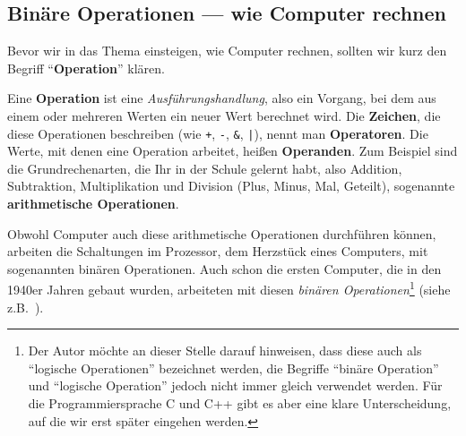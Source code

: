 \subsection{Binäre Operationen — wie Computer rechnen}
\label{sec:etwas-mathematik:binäre-operationen}

Bevor wir in das Thema einsteigen, wie Computer rechnen, sollten wir kurz den 
Begriff ``\textbf{Operation}'' klären.

Eine \textbf{Operation} ist eine \emph{Ausführungshandlung}, also ein Vorgang, 
bei dem aus einem oder mehreren Werten ein neuer Wert berechnet wird. Die 
\textbf{Zeichen}, die diese Operationen beschreiben (wie \texttt{+}, \texttt{-}, 
\texttt{\&}, \texttt{|}), nennt man \textbf{Operatoren}. Die Werte, mit denen 
eine Operation arbeitet, heißen \textbf{Operanden}. Zum Beispiel sind die 
Grundrechenarten, die Ihr in der Schule gelernt habt, also Addition, Subtraktion, 
Multiplikation und Division (Plus, Minus, Mal, Geteilt), sogenannte 
\textbf{arithmetische Operationen}. 

Obwohl Computer auch diese arithmetische Operationen durchführen können, arbeiten 
die Schaltungen im Prozessor, dem Herzstück eines Computers, mit sogenannten 
binären Operationen. Auch schon die ersten Computer, die in den 1940er Jahren 
gebaut wurden, arbeiteten mit diesen \emph{binären Operationen}\footnote{%
  Der Autor möchte an dieser Stelle darauf hinweisen, dass diese auch als ``logische
  Operationen'' bezeichnet werden, die Begriffe ``binäre Operation'' und 
  ``logische Operation'' jedoch nicht immer gleich verwendet  werden. Für die Programmiersprache 
  C und C++ gibt es aber eine klare Unterscheidung, auf die wir erst später eingehen werden.} 
(siehe z.B.\ \cite{wikipedia:computer}).

